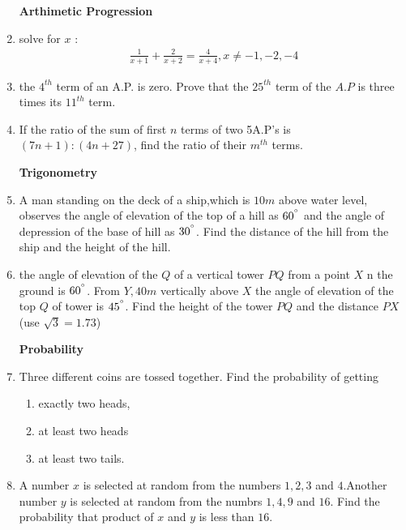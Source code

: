 \documentclass{article}
\begin{document}
\begin{enumerate}
		\centerline{\textbf{Arthimetic Progression}}

\item solve for $x$ :
	\begin{align}
		\frac{1}{x+1}+\frac{2}{x+2}=\frac{4}{x+4},x \not=-1,-2,-4
	\end{align}

\item the $4^{th}$ term of an A.P. is zero. Prove that the $25^{th}$ term of the $A.P$ is three times its $11^{th}$ term.

\item If the ratio of the sum of first $n$ terms of two 5A.P's is $(7n+1):(4n+27)$, find the ratio of their $m^{th}$ terms.

	\centerline{\textbf{Trigonometry}}

\item A man standing on the deck of a ship,which is $10 m$ above water level, observes the angle of elevation of the top of a hill as $60^{\degree}$ and the angle of depression of the base of hill as $30^{\degree}$. Find the distance of the hill from the ship and the height of the hill.

\item the angle of elevation of the $Q$ of a vertical tower $PQ$ from a point $X$ n the ground is $60^{\degree}$. From $Y,40 m$ vertically above $X$ the angle of elevation of the top $Q$ of tower is $45^{\degree}$. Find the height of the tower $PQ$ and the distance $PX$ (use $\sqrt{3}=1.73$)	
	\centerline{\textbf{Probability}}

\item Three different coins are tossed together. Find the probability of getting
	      \begin{enumerate}[label=\roman*]
 \item exactly two heads,
							
 \item at least two heads
						
 \item at least two tails.
	      \end{enumerate}
\item A number $x$ is selected at random from the numbers $1,2,3$ and $4$.Another number $y$ is selected at random from the numbrs $1,4,9$ and $16$. Find the probability that product of $x$ and $y$ is less than $16$.

\end{enumerate}
\end{document}
